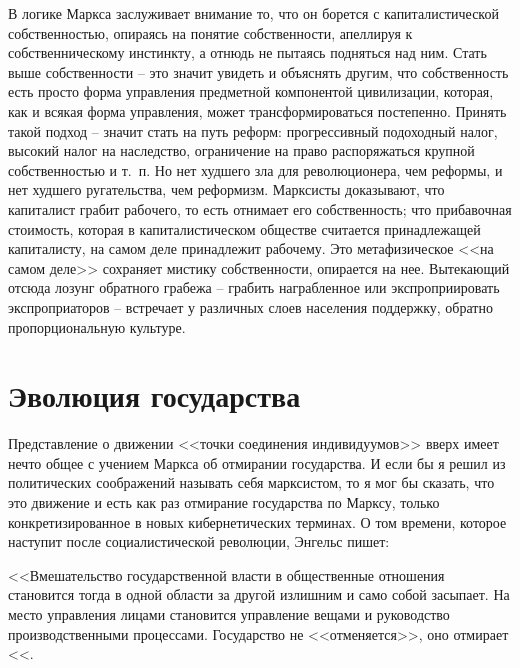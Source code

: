 \documentclass{book}
\begin{document}
В логике Маркса заслуживает внимание то, что он борется с капиталистической собственностью, опираясь на понятие соб­ственности, апеллируя к собственническому инстинкту, а отнюдь не пытаясь подняться над ним. Стать выше собственности -- это значит увидеть и объяснять другим, что собственность есть просто форма управления предметной компонентой цивилиза­ции, которая, как и всякая форма управления, может транс­формироваться постепенно. Принять такой подход -- значит стать на путь реформ: прогрессивный подоходный налог, высо­кий налог на наследство, ограничение на право распоряжаться крупной собственностью и т.~п. Но нет худшего зла для рево­люционера, чем реформы, и нет худшего ругательства, чем ре­формизм. Марксисты доказывают, что капиталист грабит  рабо­чего, то есть отнимает его собственность;  что прибавочная сто­имость, которая в капиталистическом обществе считается при­надлежащей капиталисту, на самом деле  принадлежит рабочему. Это метафизическое <<на самом деле>> сохраняет мистику собст­венности, 
опирается на нее. Вытекающий отсюда лозунг обрат­ного грабежа -- грабить награбленное или экспроприировать экспроприаторов -- встречает у различных слоев населения поддержку, обратно пропорциональную культуре.


\section{Эволюция государства}

Представление о движении <<точки соединения индивиду­умов>> вверх имеет нечто общее с учением Маркса об отмира­нии государства. И если бы я решил из политических сообра­жений называть себя марксистом, то я мог бы сказать, что это движение и есть как раз отмирание государства по Марксу, только конкретизированное в новых кибернетических терми­нах. О том времени, которое наступит после социалистической революции, Энгельс пишет:

<<Вмешательство государственной власти в общественные отношения становится тогда в одной области за другой излиш­ним и само собой засыпает. На место управления лицами стано­вится управление вещами и руководство производственными процессами. Государство не <<отменяется>>, оно отмирает <<. 
\end{document}
